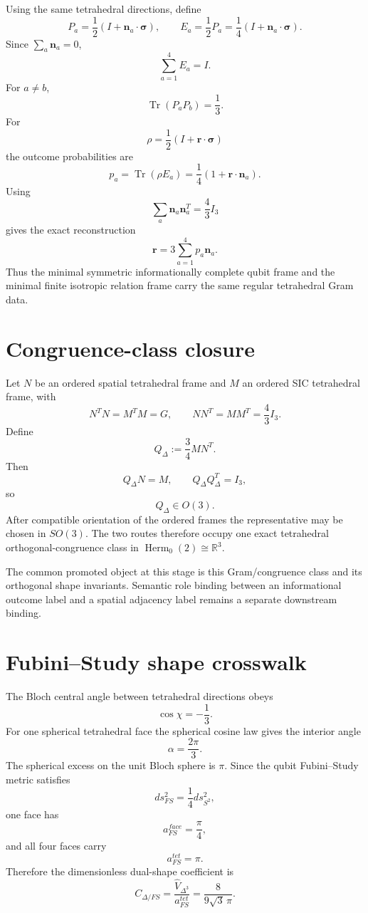 Using the same tetrahedral directions, define
\[
P_a=\frac12(I+\mathbf n_a\cdot\boldsymbol\sigma),
\qquad
E_a=\frac12P_a
=\frac14(I+\mathbf n_a\cdot\boldsymbol\sigma).
\]
Since \(\sum_a\mathbf n_a=0\),
\[
\boxed{\sum_{a=1}^{4}E_a=I}.
\]
For \(a\neq b\),
\[
\boxed{\operatorname{Tr}(P_aP_b)=\frac13}.
\]
For
\[
\rho=\frac12(I+\mathbf r\cdot\boldsymbol\sigma)
\]
the outcome probabilities are
\[
p_a=\operatorname{Tr}(\rho E_a)
=\frac14(1+\mathbf r\cdot\mathbf n_a).
\]
Using
\[
\sum_a\mathbf n_a\mathbf n_a^T=\frac43I_3
\]
gives the exact reconstruction
\[
\boxed{
\mathbf r
=
3\sum_{a=1}^{4}p_a\mathbf n_a.
}
\]
Thus the minimal symmetric informationally complete qubit frame and the minimal
finite isotropic relation frame carry the same regular tetrahedral Gram data.

\section{Congruence-class closure}

Let \(N\) be an ordered spatial tetrahedral frame and \(M\) an ordered SIC
tetrahedral frame, with
\[
N^TN=M^TM=G,
\qquad
NN^T=MM^T=\frac43I_3.
\]
Define
\[
\boxed{Q_{\Delta}:=\frac34MN^T.}
\]
Then
\[
Q_{\Delta}N=M,
\qquad
Q_{\Delta}Q_{\Delta}^T=I_3,
\]
so
\[
\boxed{Q_{\Delta}\in O(3).}
\]
After compatible orientation of the ordered frames the representative may be
chosen in \(SO(3)\).  The two routes therefore occupy one exact tetrahedral
orthogonal-congruence class in
\(\operatorname{Herm}_0(2)\cong\mathbb R^3\).

The common promoted object at this stage is this Gram/congruence class and its
orthogonal shape invariants.  Semantic role binding between an informational
outcome label and a spatial adjacency label remains a separate downstream
binding.

\section{Fubini--Study shape crosswalk}

The Bloch central angle between tetrahedral directions obeys
\[
\cos\chi=-\frac13.
\]
For one spherical tetrahedral face the spherical cosine law gives the interior
angle
\[
\alpha=\frac{2\pi}{3}.
\]
The spherical excess on the unit Bloch sphere is \(\pi\).  Since the qubit
Fubini--Study metric satisfies
\[
ds_{FS}^2=\frac14ds_{S^2}^2,
\]
one face has
\[
\boxed{a_{FS}^{face}=\frac\pi4},
\]
and all four faces carry
\[
\boxed{a_{FS}^{tet}=\pi}.
\]
Therefore the dimensionless dual-shape coefficient is
\[
\boxed{
C_{\Delta/FS}
=
\frac{\hat V_{\Delta^3}}{a_{FS}^{tet}}
=
\frac{8}{9\sqrt3\,\pi}.
}
\]

